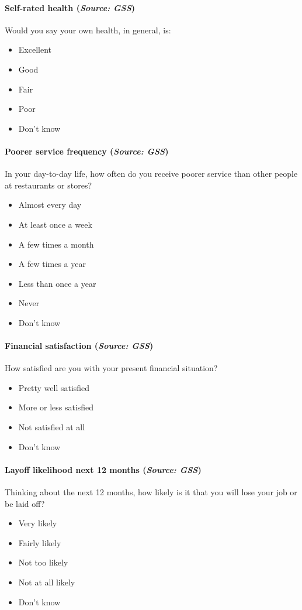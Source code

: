\documentclass[letterpaper,12pt]{article}
\theoremstyle{proposition}
\begin{document}
\paragraph{Self-rated health (\textit{Source: GSS})}
Would you say your own health, in general, is:
\begin{itemize}[itemsep=-10pt,topsep=0pt]
\item Excellent
\item Good
\item Fair
\item Poor
\item Don’t know
\end{itemize}

\paragraph{Poorer service frequency (\textit{Source: GSS})}
In your day-to-day life, how often do you receive poorer service than other people at restaurants or stores?
\begin{itemize}[itemsep=-10pt,topsep=0pt]
\item Almost every day
\item At least once a week
\item A few times a month
\item A few times a year
\item Less than once a year
\item Never
\item Don’t know
\end{itemize}

\paragraph{Financial satisfaction (\textit{Source: GSS})}
How satisfied are you with your present financial situation?
\begin{itemize}[itemsep=-10pt,topsep=0pt]
\item Pretty well satisfied
\item More or less satisfied
\item Not satisfied at all
\item Don’t know
\end{itemize}

\paragraph{Layoff likelihood next 12 months (\textit{Source: GSS})}
Thinking about the next 12 months, how likely is it that you will lose your job or be laid off?
\begin{itemize}[itemsep=-10pt,topsep=0pt]
\item Very likely
\item Fairly likely
\item Not too likely
\item Not at all likely
\item Don’t know
\end{itemize}
\end{document}
